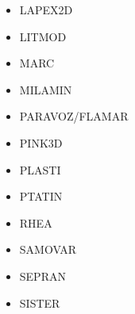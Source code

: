 \begin{itemize}
\item LAPEX2D
\cite{sopg05}
\cite{bbeg06}
\cite{baso08}
\cite{scbe08}
\cite{sosk11}


\item LITMOD
\cite{afrf07}
\cite{affr08}
\cite{fuac09}
\cite{fufa10}


\item MARC
\cite{nesg97}
\cite{nesb99}


\item MILAMIN
\cite{daks08}
\cite{yakm11}
\cite{gebk12}
\cite{jobk14}
\cite{lukz15}\cite{gehm15}\cite{thkp15}
\cite{jads16}\cite{maka16}



\item PARAVOZ/FLAMAR
\cite{poli93}
\cite{bujl01}\cite{bupo01}
\cite{bast02}\cite{clbb02}
\cite{hags03}\cite{gehd03}
\cite{guhl04}\cite{gewi04}\cite{toba04}\cite{tibb04}
\cite{bugu05}
\cite{yaab07}\cite{buto07}
\cite{yaba08}\cite{tibb08}
\cite{gecm09}\cite{yahb09}
\cite{anwb12}\cite{gech12}\cite{gubc12}\cite{gerb12}\cite{fagm12}
\cite{frba14}\cite{gagb14}\cite{bufa14}
\cite{wulc15}\cite{marl15}\cite{gebw15}\cite{svlh15}




\item PINK3D
\cite{vosc15}


\item PLASTI
\cite{fuwb06}



\item PTATIN
\cite{phil13}
\cite{mabl14}
\cite{mabl15}
\cite{lemh17}
\cite{jolp18}
\cite{jolm19}


\item RHEA
\cite{bugg08}
\cite{stgb10}
\cite{algs12}
\cite{busa13}

\item SAMOVAR
\cite{egat10}

\item SEPRAN
\cite{beky93}
\cite{vlvv94}
\cite{civv02}
\cite{vavv02}
\cite{vavs03}
\cite{vavv04}
\cite{vavv04b}
\cite{vavv05}
\cite{sepr05}
\cite{liva06a}
\cite{liva06b}
\cite{vant07}
\cite{brva07a}
\cite{brva07b}
\cite{plva08}
\cite{vavl09}
\cite{vahy10}
\cite{syva10}
\cite{vahs11}
\cite{besy12}
\cite{beva12}
\cite{chgv12}
\cite{ancv13}
\cite{chsg14}
\cite{mova14}
\cite{vasy15}
\cite{zhdv19}

\item SISTER


\end{itemize}
